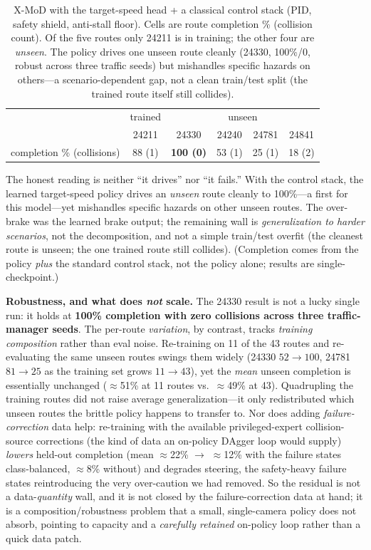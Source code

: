 \documentclass[10pt]{article}
\begin{document}
\begin{table}[ht]
\centering
\caption{X-MoD with the target-speed head + a classical control stack (PID, safety shield, anti-stall
floor). Cells are route completion \% (collision count). Of the five routes only 24211 is in training;
the other four are \emph{unseen}. The policy drives one unseen route cleanly (24330, 100\%/0, robust
across three traffic seeds) but mishandles specific hazards on others---a scenario-dependent gap, not a
clean train/test split (the trained route itself still collides).}
\label{tab:v2}
\begin{tabular}{lc|cccc}
\toprule
 & trained & \multicolumn{4}{c}{unseen} \\
 & 24211 & 24330 & 24240 & 24781 & 24841 \\
\midrule
completion \% (collisions) & 88 (1) & \textbf{100 (0)} & 53 (1) & 25 (1) & 18 (2) \\
\bottomrule
\end{tabular}
\end{table}

The honest reading is neither ``it drives'' nor ``it fails.'' With the control stack, the learned
target-speed policy drives an \emph{unseen} route cleanly to 100\%---a first for this model---yet
mishandles specific hazards on other unseen routes. The over-brake was the learned brake output; the
remaining wall is \emph{generalization to harder scenarios}, not the decomposition, and not a simple
train/test overfit (the cleanest route is unseen; the one trained route still collides). (Completion
comes from the policy \emph{plus} the standard control stack, not the policy alone; results are
single-checkpoint.)

\textbf{Robustness, and what does \emph{not} scale.} The 24330 result is not a lucky single run: it
holds at \textbf{100\% completion with zero collisions across three traffic-manager seeds}. The
per-route \emph{variation}, by contrast, tracks \emph{training composition} rather than eval noise.
Re-training on 11 of the 43 routes and re-evaluating the same unseen routes swings them widely (24330
$52\rightarrow100$, 24781 $81\rightarrow25$ as the training set grows $11\rightarrow43$), yet the
\emph{mean} unseen completion is essentially unchanged ($\approx$51\% at 11 routes vs.\ $\approx$49\% at
43). Quadrupling the training routes did not raise average generalization---it only redistributed which
unseen routes the brittle policy happens to transfer to. Nor does adding \emph{failure-correction} data
help: re-training with the available privileged-expert collision-source corrections (the kind of data
an on-policy DAgger loop would supply) \emph{lowers} held-out completion (mean $\approx$22\%
$\rightarrow$ $\approx$12\% with the failure states class-balanced, $\approx$8\% without) and degrades
steering, the safety-heavy failure states reintroducing the very over-caution we had removed. So the
residual is not a data-\emph{quantity} wall, and it is not closed by the failure-correction data at
hand; it is a composition/robustness problem that a small, single-camera policy does not absorb,
pointing to capacity and a \emph{carefully retained} on-policy loop rather than a quick data patch.
\end{document}
